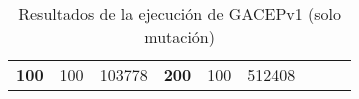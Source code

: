 \begin{table}[]
\begin{tabular}{|ccrccrccr}
\multicolumn{1}{|c|}{\multirow{-39}{*}{\cellcolor[HTML]{FFFFC7}\textbf{100}}} & \multicolumn{1}{c|}{\multirow{-9}{*}{\cellcolor[HTML]{DDFDFF}100}} & \multicolumn{1}{r|}{\cellcolor[HTML]{DAE8FC}103778}    & \multicolumn{1}{c|}{\multirow{-39}{*}{\cellcolor[HTML]{FFFFC7}\textbf{200}}} & \multicolumn{1}{c|}{\multirow{-10}{*}{\cellcolor[HTML]{DDFDFF}100}} & \multicolumn{1}{r|}{\cellcolor[HTML]{DDFDFF}512408}    &                                                                              &                                                                    &                                                        \\ \cline{1-6}
\end{tabular}
\caption{\label{HistMut}Resultados de la ejecución de GACEPv1 (solo mutación)}
\end{table}

